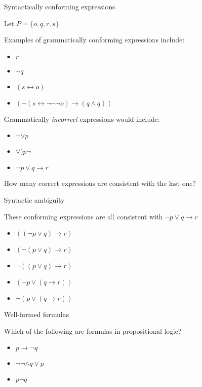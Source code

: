 \documentclass[
  ignorenonframetext,
]{beamer}
\providecommand{\tightlist}{%
  \setlength{\itemsep}{0pt}\setlength{\parskip}{0pt}}
\begin{document}
\begin{frame}{Syntactically conforming expressions}
\protect\hypertarget{syntactically-conforming-expressions}{}

Let \(P = \{o,q,r,s\}\)

Examples of grammatically conforming expressions include:

\begin{itemize}[<+->]
\tightlist
\item
  \(r\)
\item
  \({\neg}q\)
\item
  \((s \leftrightarrow o)\)
\item
  \(({\neg}(s \leftrightarrow \neg\neg{\neg}o) \rightarrow (q \wedge q))\)
\end{itemize}

Grammatically \emph{incorrect} expressions would include:

\begin{itemize}[<+->]
\tightlist
\item
  \(\neg\vee p\)
\item
  \(\vee ) p \neg\)
\item
  \({\neg}p \vee q \rightarrow r\)
\end{itemize}

How many correct expressions are consistent with the last one?

\end{frame}

\begin{frame}{Syntactic ambiguity}
\protect\hypertarget{syntactic-ambiguity}{}

These conforming expressions are all consistent with
\({\neg}p \vee q \rightarrow r\)

\begin{itemize}[<+->]
\tightlist
\item
  \((({\neg}p \vee q) \rightarrow r)\)
\item
  \(({\neg}(p \vee q) \rightarrow r)\)
\item
  \({\neg}((p \vee q) \rightarrow r)\)
\item
  \(({\neg}p \vee (q \rightarrow r))\)
\item
  \({\neg}(p \vee (q \rightarrow r))\)
\end{itemize}

\end{frame}

\begin{frame}{Well-formed formulas}
\protect\hypertarget{well-formed-formulas}{}

Which of the following are formulas in propositional logic?

\begin{itemize}[<+->]
\tightlist
\item
  \(p \rightarrow {\neg}q\)
\item
  \({\neg}{\neg} \wedge q \vee p\)
\item
  \(p{\neg}q\)
\end{itemize}

\end{frame}
\end{document}
